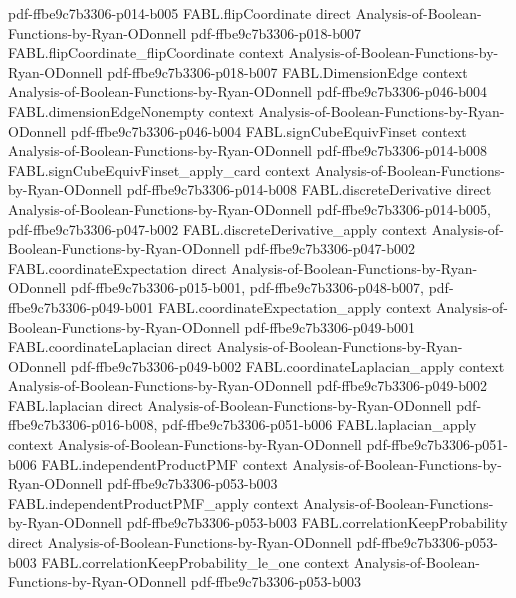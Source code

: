 \begin{theorem}
  {pdf-ffbe9c7b3306-p014-b005}
\proofstep
  {FABL.flipCoordinate}
  {direct}
  {Analysis-of-Boolean-Functions-by-Ryan-ODonnell}
  {pdf-ffbe9c7b3306-p018-b007}
\proofstep
  {FABL.flipCoordinate_flipCoordinate}
  {context}
  {Analysis-of-Boolean-Functions-by-Ryan-ODonnell}
  {pdf-ffbe9c7b3306-p018-b007}
\proofstep
  {FABL.DimensionEdge}
  {context}
  {Analysis-of-Boolean-Functions-by-Ryan-ODonnell}
  {pdf-ffbe9c7b3306-p046-b004}
\proofstep
  {FABL.dimensionEdgeNonempty}
  {context}
  {Analysis-of-Boolean-Functions-by-Ryan-ODonnell}
  {pdf-ffbe9c7b3306-p046-b004}
\proofstep
  {FABL.signCubeEquivFinset}
  {context}
  {Analysis-of-Boolean-Functions-by-Ryan-ODonnell}
  {pdf-ffbe9c7b3306-p014-b008}
\proofstep
  {FABL.signCubeEquivFinset_apply_card}
  {context}
  {Analysis-of-Boolean-Functions-by-Ryan-ODonnell}
  {pdf-ffbe9c7b3306-p014-b008}
\proofstep
  {FABL.discreteDerivative}
  {direct}
  {Analysis-of-Boolean-Functions-by-Ryan-ODonnell}
  {pdf-ffbe9c7b3306-p014-b005,
    pdf-ffbe9c7b3306-p047-b002}
\proofstep
  {FABL.discreteDerivative_apply}
  {context}
  {Analysis-of-Boolean-Functions-by-Ryan-ODonnell}
  {pdf-ffbe9c7b3306-p047-b002}
\proofstep
  {FABL.coordinateExpectation}
  {direct}
  {Analysis-of-Boolean-Functions-by-Ryan-ODonnell}
  {pdf-ffbe9c7b3306-p015-b001,
    pdf-ffbe9c7b3306-p048-b007,
    pdf-ffbe9c7b3306-p049-b001}
\proofstep
  {FABL.coordinateExpectation_apply}
  {context}
  {Analysis-of-Boolean-Functions-by-Ryan-ODonnell}
  {pdf-ffbe9c7b3306-p049-b001}
\proofstep
  {FABL.coordinateLaplacian}
  {direct}
  {Analysis-of-Boolean-Functions-by-Ryan-ODonnell}
  {pdf-ffbe9c7b3306-p049-b002}
\proofstep
  {FABL.coordinateLaplacian_apply}
  {context}
  {Analysis-of-Boolean-Functions-by-Ryan-ODonnell}
  {pdf-ffbe9c7b3306-p049-b002}
\proofstep
  {FABL.laplacian}
  {direct}
  {Analysis-of-Boolean-Functions-by-Ryan-ODonnell}
  {pdf-ffbe9c7b3306-p016-b008,
    pdf-ffbe9c7b3306-p051-b006}
\proofstep
  {FABL.laplacian_apply}
  {context}
  {Analysis-of-Boolean-Functions-by-Ryan-ODonnell}
  {pdf-ffbe9c7b3306-p051-b006}
\proofstep
  {FABL.independentProductPMF}
  {context}
  {Analysis-of-Boolean-Functions-by-Ryan-ODonnell}
  {pdf-ffbe9c7b3306-p053-b003}
\proofstep
  {FABL.independentProductPMF_apply}
  {context}
  {Analysis-of-Boolean-Functions-by-Ryan-ODonnell}
  {pdf-ffbe9c7b3306-p053-b003}
\proofstep
  {FABL.correlationKeepProbability}
  {direct}
  {Analysis-of-Boolean-Functions-by-Ryan-ODonnell}
  {pdf-ffbe9c7b3306-p053-b003}
\proofstep
  {FABL.correlationKeepProbability_le_one}
  {context}
  {Analysis-of-Boolean-Functions-by-Ryan-ODonnell}
  {pdf-ffbe9c7b3306-p053-b003}

\end{theorem}
